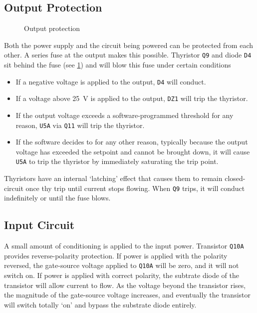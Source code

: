 \documentclass[letterpaper,twocolumn,10pt,openany,oneside,final,fleqn]{memoir}
\newcommand{\rd}[1]{\texttt{#1}}
\newcommand{\xcircuit}[1]{ \centering \textsf{  } }
\begin{document}
\subsection{Output Protection}

\begin{figure}
\xcircuit{outputprot}
\caption{Output protection}
\label{fig:outputprot}
\end{figure}

Both the power supply and the circuit being powered can be protected from each other.
A series fuse at the output makes this possible. Thyristor \rd{Q9} and diode \rd{D4}
sit behind the fuse (see \cref{fig:outputprot}) and
will blow this fuse under certain conditions

\begin{itemize}
    \item{If a negative voltage is applied to the output, \rd{D4} will conduct.}
    \item{If a voltage above \SI{25}{V} is applied to the output, \rd{DZ1} will
        trip the thyristor.}
    \item{If the output voltage exceeds a software-programmed threshold for any
        reason, \rd{U5A} via \rd{Q11} will trip the thyristor.}
    \item{If the software decides to for any other reason, typically because the
        output voltage has exceeded the setpoint and cannot be brought down,
        it will cause \rd{U5A} to trip the thyristor by immediately saturating
        the trip point.}
\end{itemize}

Thyristors have an internal `latching' effect that causes them to remain closed-circuit
once thy trip until current stops flowing. When \rd{Q9} trips, it will conduct indefinitely
or until the fuse blows.

\subsection{Input Circuit}

A small amount of conditioning is applied to the input power. Transistor \rd{Q10A}
provides reverse-polarity protection. If power is applied with the polarity reversed,
the gate-source voltage applied to \rd{Q10A} will be zero, and it will not switch
on. If power is applied with correct polarity, the subtrate diode of the transistor
will allow current to flow. As the voltage beyond the transistor rises, the magnitude
of the gate-source voltage increases, and eventually the transistor will switch totally
`on' and bypass the substrate diode entirely.
\end{document}
